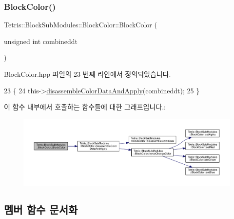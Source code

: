 \subsubsection{\texorpdfstring{Block\+Color()}{BlockColor()}\hspace{0.1cm}{\footnotesize\ttfamily [2/2]}}
{\footnotesize\ttfamily Tetris\+::\+Block\+Sub\+Modules\+::\+Block\+Color\+::\+Block\+Color (\begin{DoxyParamCaption}\item[{unsigned int}]{combineddt }\end{DoxyParamCaption})\hspace{0.3cm}{\ttfamily [inline]}}



Block\+Color.\+hpp 파일의 23 번째 라인에서 정의되었습니다.


\begin{DoxyCode}
23                                                \{
24                 this->\hyperlink{class_tetris_1_1_block_sub_modules_1_1_block_color_afc3bb979353c91cf992101ed2dde610f}{disassembleColorDataAndApply}(combineddt);
25             \}
\end{DoxyCode}
이 함수 내부에서 호출하는 함수들에 대한 그래프입니다.\+:
\nopagebreak
\begin{figure}[H]
\begin{center}
\leavevmode
\includegraphics[width=350pt]{de/d44/class_tetris_1_1_block_sub_modules_1_1_block_color_aba62c9da4cb4b43caa871452a34790a9_cgraph}
\end{center}
\end{figure}


\subsection{멤버 함수 문서화}
\mbox{\label{class_tetris_1_1_block_sub_modules_1_1_block_color_a216ddc10773f9d0dc44eca5b8b3d8336}} 

